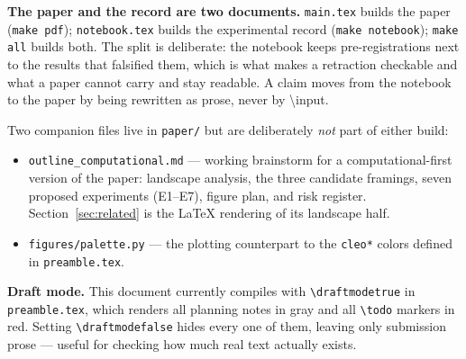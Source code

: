 \bigskip
\noindent
\textbf{The paper and the record are two documents.} \texttt{main.tex} builds
the paper (\texttt{make pdf}); \texttt{notebook.tex} builds the experimental
record (\texttt{make notebook}); \texttt{make all} builds both. The split is
deliberate: the notebook keeps pre-registrations next to the results that
falsified them, which is what makes a retraction checkable and what a paper
cannot carry and stay readable. A claim moves from the notebook to the paper by
being rewritten as prose, never by \textbackslash input.

\bigskip
\noindent
Two companion files live in \texttt{paper/} but are deliberately \emph{not}
part of either build:
\begin{itemize}\setlength{\itemsep}{0pt}
  \item \texttt{outline\_computational.md} --- working brainstorm for a
        computational-first version of the paper: landscape analysis, the
        three candidate framings, seven proposed experiments (E1--E7), figure
        plan, and risk register. Section~\ref{sec:related} is the LaTeX
        rendering of its landscape half.
  \item \texttt{figures/palette.py} --- the plotting counterpart to the
        \texttt{cleo*} colors defined in \texttt{preamble.tex}.
\end{itemize}

\bigskip
\noindent
\textbf{Draft mode.} This document currently compiles with
\texttt{\textbackslash draftmodetrue} in \texttt{preamble.tex}, which renders
all planning notes in gray and all \texttt{\textbackslash todo} markers in red.
Setting \texttt{\textbackslash draftmodefalse} hides every one of them, leaving
only submission prose --- useful for checking how much real text actually
exists.
